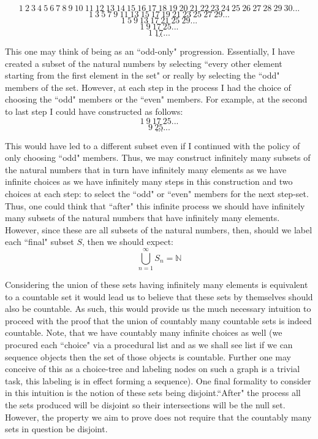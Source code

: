\documentclass{article}
\begin{document}
\[
1\:2\:3\:4\:5\:6\:7\:8\:9\:10\:11\:12\:13\:14\:15\:16\:17\:18\:19\:20\:21\:22\:23\:24\:25\:26\:27\:28\:29\:30...
\]
\[
1\:3\:5\:7\:9\:11\:13\:15\:17\:19\:21\:23\:25\:27\:29...
\]
\[
1\:5\:9\:13\:17\:21\:25\:29...
\]
\[
1\:9\:17\:25...
\]
\[
1\:17...
\]
\[
.
.
.
\]
\par This one may think of being as an ``odd-only" progression. Essentially, I have created a subset of the natural numbers by selecting ``every other element starting from the first element in the set" or really by selecting the ``odd" members of the set. However, at each step in the process I had the choice of choosing the ``odd" members or the ``even" members. For example, at the second to last step I could have constructed as follows:
\[
1\:9\:17\:25...
\]
\[
9\:25...
\]
\[
.
.
.
\]
\par This would have led to a different subset even if I continued with the policy of only choosing ``odd" members. Thus, we may construct infinitely many subsets of the natural numbers that in turn have infinitely many elements as we have infinite choices as we have infinitely many steps in this construction and two choices at each step: to select the ``odd" or ``even" members for the next step-set. Thus, one could think that ``after" this infinite process we should have infinitely many subsets of the natural numbers that have infinitely many elements. However, since these are all subsets of the natural numbers, then, should we label each ``final" subset $S$, then we should expect:
\[
\bigcup_{n=1}^{\infty} S_{n}=\mathbb{N}
\]
\par Considering the union of these sets having infinitely many elements is equivalent to a countable set it would lead us to believe that these sets by themselves should also be countable. As such, this would provide us the much necessary intuition to proceed with the proof that the union of countably many countable sets is indeed countable. Note, that we have countably many infinite choices as well (we procured each ``choice" via a procedural list and as we shall see list if we can sequence objects then the set of those objects is countable. Further one may conceive of this as a choice-tree and labeling nodes on such a graph is a trivial task, this labeling is in effect forming a sequence). One final formality to consider in this intuition is the notion of these sets being disjoint.``After" the process all the sets produced will be disjoint so their intersections will be the null set. However, the property we aim to prove does not require that the countably many sets in question be disjoint.
\end{document}
